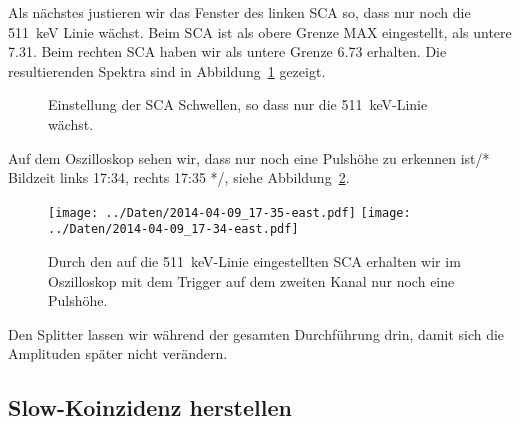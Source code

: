 Als nächstes justieren wir das Fenster des linken SCA so, dass nur noch die
\SI{511}{\kilo\electronvolt} Linie wächst. Beim SCA ist als obere Grenze MAX
eingestellt, als untere \num{7.31}. Beim rechten SCA haben wir als untere
Grenze \num{6.73} erhalten. Die resultierenden Spektra sind in
Abbildung~\ref{mca:fenster} gezeigt.

\begin{figure}[htbp]
    \centering
    \hfill
    \caption{%
        Einstellung der SCA Schwellen, so dass nur die
        \SI{511}{\kilo\electronvolt}-Linie wächst.
    }
    \label{mca:fenster}
\end{figure}

Auf dem Oszilloskop sehen wir, dass nur noch eine Pulshöhe zu erkennen ist/*
Bildzeit links 17:34, rechts 17:35 */, siehe
Abbildung~\ref{fig:eine_pulshoehe}.

\begin{figure}[htbp]
    \centering
    \texttt{[image: ../Daten/2014-04-09\_17-35-east.pdf]}
    \hfill
    \texttt{[image: ../Daten/2014-04-09\_17-34-east.pdf]}
    \caption{%
        Durch den auf die \SI{511}{\kilo\electronvolt}-Linie eingestellten SCA
        erhalten wir im Oszilloskop mit dem Trigger auf dem zweiten Kanal nur
        noch eine Pulshöhe.
    }
    \label{fig:eine_pulshoehe}
\end{figure}

Den Splitter lassen wir während der gesamten Durchführung drin, damit sich die
Amplituden später nicht verändern.

\subsection{Slow-Koinzidenz herstellen}

